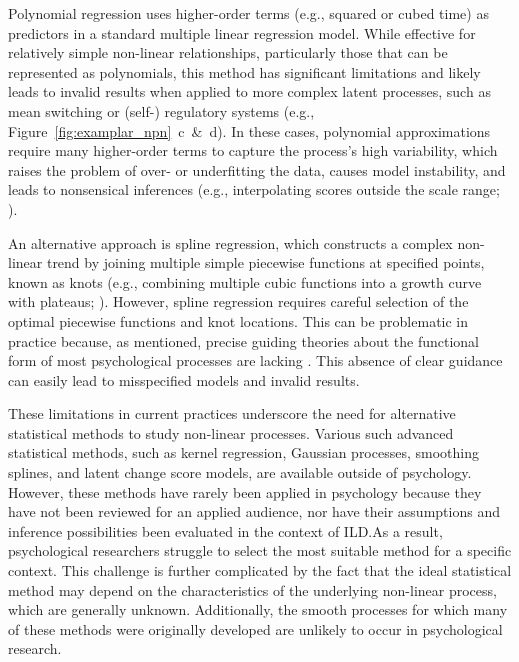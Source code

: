 \documentclass[man, floatsintext]{apa7}
\begin{document}
Polynomial regression \parencite{jebb_time_2015} uses higher-order terms
(e.g., squared or cubed time) as predictors in a standard multiple linear
regression model. While effective for relatively simple non-linear
relationships,
particularly those that can be represented as polynomials, this method has
significant limitations and likely leads to invalid results when applied to
more complex latent processes, such as mean switching or (self-) regulatory
systems (e.g., Figure~\ref{fig:examplar_npn}~c~\&~d). In these cases,
polynomial approximations require many higher-order
terms to capture the process's high variability, which raises the problem of
over- or underfitting the data, causes model instability, and leads to
nonsensical inferences (e.g., interpolating scores outside the scale range;
\textcite{boyd_divergence_2009,harrell_general_2001}).

An alternative approach is spline regression, which constructs a complex
non-linear trend by joining multiple simple piecewise functions at specified
points, known as knots (e.g., combining multiple cubic functions into a growth
curve with plateaus; \textcite{tsay_nonlinear_2019}). However, spline
regression requires careful selection of the optimal piecewise functions and
knot locations. This can be problematic in practice because, as mentioned,
precise guiding theories about the functional form of most psychological
processes are lacking \parencite{tan_time-varying_2011}. This absence of clear
guidance can easily lead to misspecified models and invalid results.

These limitations in current practices underscore the need for alternative
statistical methods to study non-linear processes. Various
such advanced statistical
methods, such as kernel regression, Gaussian processes, smoothing splines, and
latent change score models, are available outside of psychology. However, these
methods have rarely been applied in psychology because they have not been
reviewed for an applied audience, nor have their assumptions and inference
possibilities been evaluated in the context of ILD.\@ As a result,
psychological researchers struggle to select the most suitable method for a
specific context. This challenge is further complicated by the fact that the
ideal statistical method may depend on the characteristics of the underlying
non-linear process, which are generally unknown. Additionally, the smooth
processes for which many of these methods were originally developed are
unlikely to occur in psychological research.
\end{document}
